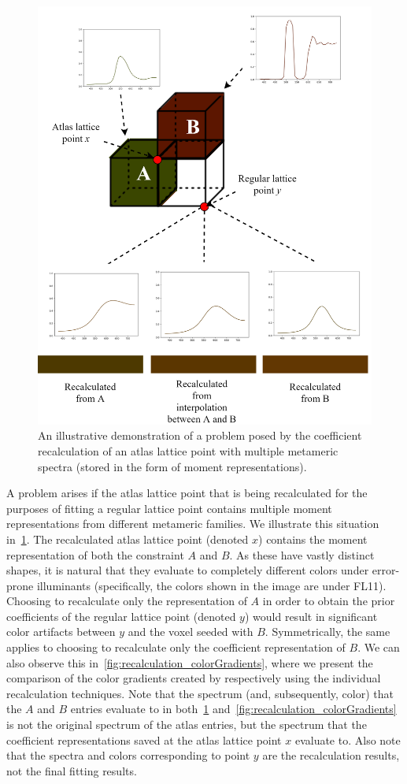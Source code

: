 \begin{figure}[t!]
	\centering
	\captionsetup[subfigure]{font=footnotesize,labelfont=footnotesize}
	\includegraphics[width=0.8\linewidth]{img/recalculation.png}
	\caption{An illustrative demonstration of a problem posed by the coefficient recalculation of an atlas lattice point with multiple metameric spectra (stored in the form of moment representations).}
	\label{fig:recalculation_process}
\end{figure}

A problem arises if the atlas lattice point that is being recalculated for the purposes of fitting a regular lattice point contains multiple moment representations from different metameric families. We illustrate this situation in~\cref{fig:recalculation_process}. The recalculated atlas lattice point (denoted $x$) contains the moment representation of both the constraint $A$ and $B$. As these have vastly distinct shapes, it is natural that they evaluate to completely different colors under error-prone illuminants (specifically, the colors shown in the image are under FL11). Choosing to recalculate only the representation of $A$ in order to obtain the prior coefficients of the regular lattice point (denoted $y$) would result in significant color artifacts between $y$ and the voxel seeded with $B$. Symmetrically, the same applies to choosing to recalculate only the coefficient representation of $B$. We can also observe this in~\cref{fig:recalculation_colorGradients}, where we present the comparison of the color gradients created by respectively using the individual recalculation techniques. Note that the spectrum (and, subsequently, color) that the $A$ and $B$ entries evaluate to in both~\cref{fig:recalculation_process} and~\cref{fig:recalculation_colorGradients} is not the original spectrum of the atlas entries, but the spectrum that the coefficient representations saved at the atlas lattice point $x$ evaluate to. Also note that the spectra and colors corresponding to point $y$ are the recalculation results, not the final fitting results.

